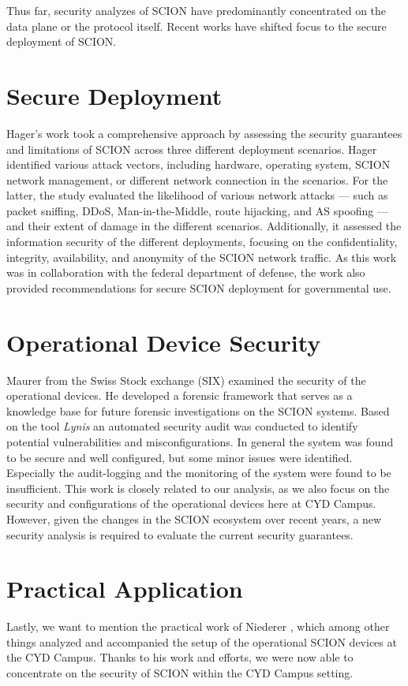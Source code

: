 Thus far, security analyzes of SCION have predominantly concentrated on the data plane or the protocol itself.
Recent works have shifted focus to the secure deployment of SCION.

\section{Secure Deployment}
Hager's work \cite{Hager2024} took a comprehensive approach by assessing the security guarantees and limitations of SCION across three different deployment scenarios.
Hager identified various attack vectors, including hardware, operating system, SCION network management, or different network connection in the scenarios.
For the latter, the study evaluated the likelihood of various network attacks --- such as packet sniffing, DDoS, Man-in-the-Middle, route hijacking, and AS spoofing --- and their extent of damage in the different scenarios.
Additionally, it assessed the information security of the different deployments, focusing on the confidentiality, integrity, availability, and anonymity of the SCION network traffic.
As this work was in collaboration with the federal department of defense, the work also provided recommendations for secure SCION deployment for governmental use.

\section{Operational Device Security}
\label{sec:operational-device-security}
Maurer \cite{Maurer2021} from the Swiss Stock exchange (SIX) examined the security of the operational devices.
He developed a forensic framework that serves as a knowledge base for future forensic investigations on the SCION systems.
Based on the tool \textit{Lynis} an automated security audit was conducted to identify potential vulnerabilities and misconfigurations.
In general the system was found to be secure and well configured, but some minor issues were identified.
Especially the audit-logging and the monitoring of the system were found to be insufficient.
This work is closely related to our analysis, as we also focus on the security and configurations of the operational devices here at CYD Campus.
However, given the changes in the SCION ecosystem over recent years, a new security analysis is required to evaluate the current security guarantees.

\section{Practical Application}
Lastly, we want to mention the practical work of Niederer \cite{Niederer2022}, which among other things analyzed and accompanied the setup of the operational SCION devices at the CYD Campus.
Thanks to his work and efforts, we were now able to concentrate on the security of SCION within the CYD Campus setting.

